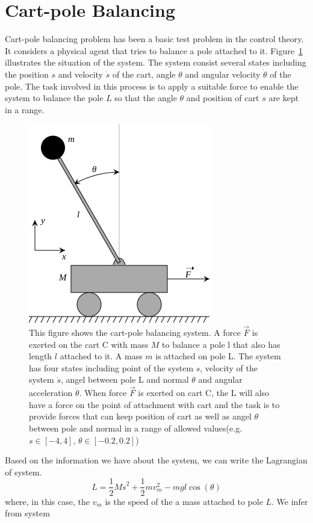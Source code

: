 \documentclass[officiallayout]{tktla}
\begin{document}
\section{Cart-pole Balancing}
Cart-pole balancing problem has been a basic test problem in the control theory. It considers a physical agent that tries to balance a pole attached to it. Figure~\ref{cart_pendulum} illustrates the situation of the system. The system consist several states including the position $s$ and velocity $\dot{s}$ of the cart, angle $\theta$ and angular velocity $\dot{\theta}$ of the pole. The task involved in this process is to apply a suitable force to enable the system to balance the pole $L$ so that the angle $\theta$ and position of cart $s$ are kept in a range.
\begin{figure}[ht]
\centering
\includegraphics[scale=0.5]{cart_pendulum}
\caption{This figure shows the cart-pole balancing system. A force $\vec{F}$ is exerted on the cart C with mass $M$ to balance a pole l that also has length $l$ attached to it. A mass $m$ is attached on pole L. The system has four states including point of the system $s$, velocity of the system $\dot{s}$, angel between pole L and normal $\theta$ and angular acceleration $ \dot{\theta}$. When force $\vec{F}$ is exerted on cart C, the L will also have a force on the point of attachment with cart and the task is to provide forces that can keep position of cart as well as angel $\theta$ between pole and normal in a range of allowed values(e.g. $s \in [-4,4]$, $\theta \in [-0.2, 0.2]$)}
\label{cart_pendulum}
\end{figure}

Based on the information we have about the system, we can write the Lagrangian of system. 
\begin{equation}
L = \frac{1}{2} M \dot{s}^2 + \frac{1}{2} m v_m^2 - mgl\cos(\theta)
\end{equation}
where, in this case, the $v_m$ is the speed of the a mass attached to pole $L$.
We infer from system 
\end{document}
